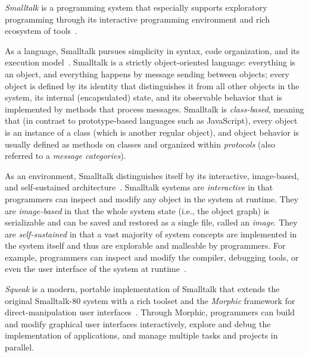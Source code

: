 \emph{Smalltalk} is a programming system that especially supports exploratory programming through its interactive programming environment and rich ecosystem of tools~\cite{ingalls2020evolution}.

As a language, Smalltalk pursues simplicity in syntax, code organization, and its execution model~\cite{goldberg1983smalltalk}.
Smalltalk is a strictly object-oriented language: everything is an object, and everything happens by message sending between objects; every object is defined by its identity that distinguishes it from all other objects in the system, its internal (encapsulated) state, and its observable behavior that is implemented by methods that process messages.
Smalltalk is \emph{class-based}, meaning that (in contrast to prototype-based languages such as JavaScript), every object is an instance of a class (which is another regular object), and object behavior is usually defined as methods on classes and organized within \emph{protocols} (also referred to a \emph{message categories}).

As an environment, Smalltalk distinguishes itself by its interactive, image-based, and self-sustained architecture~\cite{goldberg1984smalltalk}.
Smalltalk systems are \emph{interactive} in that programmers can inspect and modify any object in the system at runtime.
They are \emph{image-based} in that the whole system state (i.e., the object graph) is serializable and can be saved and restored as a single file, called an \emph{image}.
They are \emph{self-sustained} in that a vast majority of system concepts are implemented in the system itself and thus are explorable and malleable by programmers.
For example, programmers can inspect and modify the compiler, debugging tools, or even the user interface of the system at runtime~\cite{taeumel2016evolving}.

\emph{Squeak} is a modern, portable implementation of Smalltalk that extends the original Smalltalk-80 system with a rich toolset and the \emph{Morphic} framework for direct-manipulation user interfaces~\cite{ingalls1997back,ingalls2020evolution,thiede2023squeak}.
Through Morphic, programmers can build and modify graphical user interfaces interactively, explore and debug the implementation of applications, and manage multiple tasks and projects in parallel.



